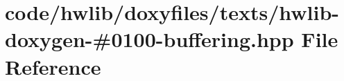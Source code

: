 \hypertarget{hwlib-doxygen-#0100-buffering_8hpp}{}\section{code/hwlib/doxyfiles/texts/hwlib-\/doxygen-\/\#0100-\/buffering.hpp File Reference}
\label{hwlib-doxygen-#0100-buffering_8hpp}
